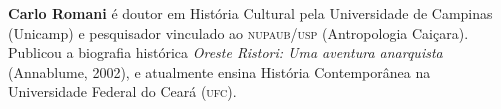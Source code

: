 \textbf{Carlo Romani} é doutor em História Cultural pela Universidade de Campinas
(Unicamp) e pesquisador vinculado ao \textsc{nupaub/usp} (Antropologia Caiçara).
Publicou a biografia histórica \textit{Oreste Ristori: Uma aventura anarquista}
(Annablume, 2002), e atualmente ensina História Contemporânea na Universidade
Federal do Ceará (\textsc{ufc}).  



